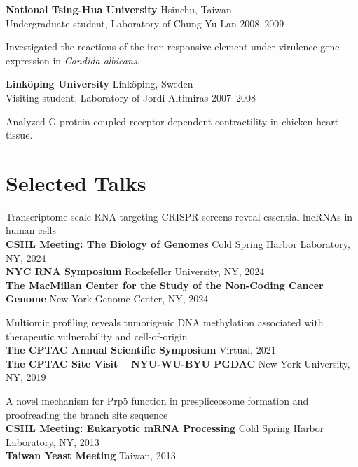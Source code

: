 \documentclass[letterpaper,11pt]{cv}
\begin{document}
\begin{entrylist}
    \item \textbf{National Tsing-Hua University} \hfill Hsinchu, Taiwan\\
    Undergraduate student, Laboratory of Chung-Yu Lan \hfill
    2008--2009
    \begin{detaillist}
        \item Investigated the reactions of the iron-responsive element under virulence gene expression in \textit{Candida albicans}.
    \end{detaillist}
    
    \item \textbf{Linköping University} \hfill Linköping, Sweden\\
    Visiting student, Laboratory of Jordi Altimiras \hfill
    2007--2008
    \begin{detaillist}
        \item Analyzed G-protein coupled receptor-dependent contractility in chicken heart tissue.
    \end{detaillist}
    
    \end{entrylist}
    

\section{Selected Talks}
\begin{entrylist}
    \item \small{Transcriptome-scale RNA-targeting CRISPR screens reveal essential lncRNAs in human cells}\\
    \textbf{CSHL Meeting: The Biology of Genomes} \hfill Cold Spring Harbor Laboratory, NY, 2024 \\
    \textbf{NYC RNA Symposium} \hfill Rockefeller University, NY, 2024 \\
    \textbf{The MacMillan Center for the Study of the
    Non-Coding Cancer Genome} \hfill New York Genome Center, NY, 2024
    \item \small{Multiomic profiling reveals tumorigenic DNA methylation associated with therapeutic vulnerability and cell-of-origin}\\ \textbf{The CPTAC Annual Scientific Symposium} \hfill Virtual, 2021 \\
    \textbf{The CPTAC Site Visit – NYU-WU-BYU PGDAC} \hfill New York University, NY, 2019
    \item \small{A novel mechanism for Prp5 function in prespliceosome formation and proofreading the branch site sequence}\\
    \textbf{CSHL Meeting: Eukaryotic mRNA Processing} \hfill Cold Spring Harbor Laboratory, NY, 2013 \\
    \textbf{Taiwan Yeast Meeting} \hfill Taiwan, 2013


\end{entrylist}
\end{document}

